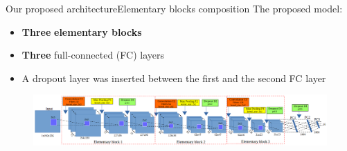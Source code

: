 \documentclass[10pt,svgnames]{beamer}
\begin{document}
\begin{frame}{Our proposed architecture}{Elementary blocks composition}
	The proposed model: 
		\small{
			\begin{itemize}
				\item \textbf{Three} \textbf{\color{elem}elementary blocks}
    			\item \textbf{Three} {\color{blue}full-connected} (FC) layers
    			\item A dropout layer was inserted between the first and the second FC layer
  			\end{itemize}}
  		
    		\begin{center}
     			\begin{figure}[htbp]
        			\centering
        			\includegraphics[scale=.2]{images/arch_model}
				\end{figure}
     		\end{center}
\end{frame}
\end{document}
